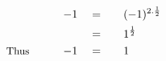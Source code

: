 \begin{alignat*}{5}
&\,&-1\quad&=\quad&&(-1)^{2.\frac{1}{2}}\\
&\,&\,&=&&1^\frac{1}{2}\\
&\small\text{Thus}\normalsize\qquad&-1\quad&=&&1
\end{alignat*}
